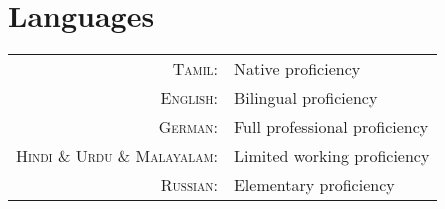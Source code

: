 \section{Languages} 
\begin{tabular}
	{rl} \textsc{Tamil:}&Native proficiency\\
	\textsc{English:}&Bilingual proficiency\\
	\textsc{German:}&Full professional proficiency\\
	\textsc{Hindi \& Urdu \& Malayalam:}&Limited working proficiency\\
	\textsc{Russian:}&Elementary proficiency\\
\end{tabular}
